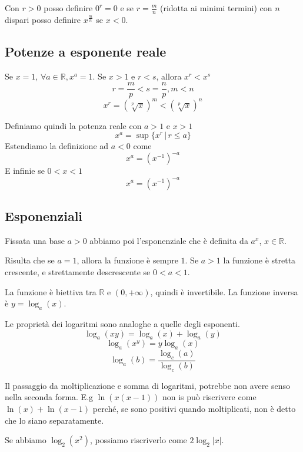 \documentclass[a4paper]{article}
\begin{document}
Con \(r>0\) posso definire \(0^r = 0\)
e se \(r=\frac{m}{n}\) (ridotta ai minimi termini) con \(n\) dispari
posso definire \(x^\frac{m}{n}\) se \(x<0\).

\subsection{Potenze a esponente reale}

Se \(x=1\), \(\forall a\in \mathbb{R}, x^a = 1\).
Se \(x>1\) e \(r<s\), allora \(x^r < x^s\)
\[
    r = \frac{m}{p} < s = \frac{n}{p}, m < n
\]
\[
    x^r = {(\sqrt[p]{x})}^m < {(\sqrt[p]{x})}^n
\]

Definiamo quindi la potenza reale con \(a>1\) e \(x>1\)
\[
    x^a = \sup \{ x^r \,|\, r \leq a \}
\]
Estendiamo la definizione ad \(a < 0\) come
\[
    x^a = {(x^{-1})}^{-a}
\]
E infinie se \(0<x<1\)
\[
    x^a = {(x^{-1})}^{-a}
\]

\pagebreak

\subsection{Esponenziali}

Fissata una base \(a>0\) abbiamo poi l'esponenziale che è definita da \(a^x\),
\(x\in\mathbb{R}\).

Risulta che se \(a=1\), allora la funzione è sempre \(1\).
Se \(a>1\) la funzione è stretta crescente, e strettamente descrescente se \(0<a<1\).

La funzione è biettiva tra \(\mathbb{R}\) e \((0, +\infty)\), quindi è invertibile.
La funzione inversa è \(y=\log_a(x)\).

Le proprietà dei logaritmi sono analoghe a quelle degli esponenti.
 {
    \[
        \log_a(xy) = \log_a(x) + \log_a(y)
    \]
    \[
        \log_a(x^y) = y\log_a(x)
    \]
    \[
        \log_a(b) = \frac{\log_c(a)}{\log_c(b)}
    \]
}



Il passaggio da moltiplicazione e somma di logaritmi, potrebbe non avere senso
nella seconda forma.
E.g \(\ln(x(x-1))\) non is può riscrivere come \(\ln(x) + \ln(x-1)\)
perché, se sono positivi quando moltiplicati, non è detto che lo siano separatamente.

Se abbiamo \(\log_2(x^2)\), possiamo riscriverlo come \(2 \log_2|x|\).

\end{document}
